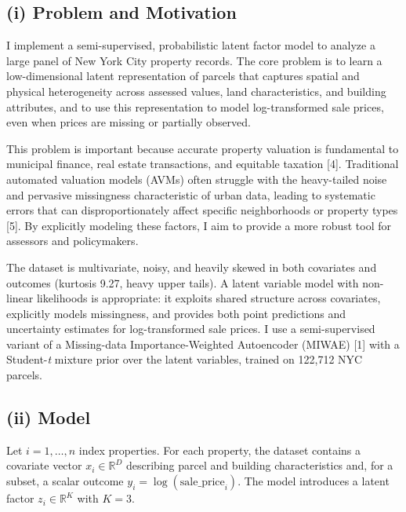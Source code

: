 \documentclass[11pt]{article}
\begin{document}
\subsection*{(i) Problem and Motivation}

I implement a semi-supervised, probabilistic latent factor model to analyze a large panel of New York City property records. The core problem is to learn a low-dimensional latent representation of parcels that captures spatial and physical heterogeneity across assessed values, land characteristics, and building attributes, and to use this representation to model log-transformed sale prices, even when prices are missing or partially observed.

This problem is important because accurate property valuation is fundamental to municipal finance, real estate transactions, and equitable taxation [4]. Traditional automated valuation models (AVMs) often struggle with the heavy-tailed noise and pervasive missingness characteristic of urban data, leading to systematic errors that can disproportionately affect specific neighborhoods or property types [5]. By explicitly modeling these factors, I aim to provide a more robust tool for assessors and policymakers.

The dataset is multivariate, noisy, and heavily skewed in both covariates and outcomes (kurtosis 9.27, heavy upper tails). A latent variable model with non-linear likelihoods is appropriate: it exploits shared structure across covariates, explicitly models missingness, and provides both point predictions and uncertainty estimates for log-transformed sale prices. I use a semi-supervised variant of a Missing-data Importance-Weighted Autoencoder (MIWAE) [1] with a Student-\emph{t} mixture prior over the latent variables, trained on 122,712 NYC parcels.

\subsection*{(ii) Model}

Let $i = 1,\dots, n$ index properties. For each property, the dataset contains a covariate vector $x_i \in \mathbb{R}^D$ describing parcel and building characteristics and, for a subset, a scalar outcome $y_i = \log(\text{sale\_price}_i)$. The model introduces a latent factor $z_i \in \mathbb{R}^K$ with $K = 3$.
\end{document}

